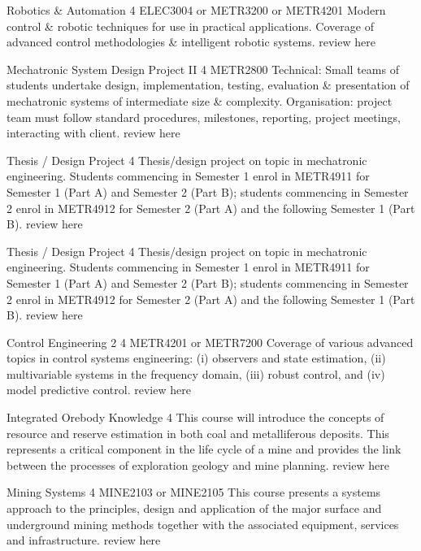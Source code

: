	{Robotics \& Automation}
	{4}
	{ELEC3004 or METR3200 or METR4201}
	{}
	{}
	{Modern control \& robotic techniques for use in practical applications. Coverage of advanced control methodologies \& intelligent robotic systems.}
	{review here}

	{Mechatronic System Design Project II}
	{4}
	{}
	{METR2800}
	{}
	{Technical: Small teams of students undertake design, implementation, testing, evaluation \& presentation of mechatronic systems of intermediate size \& complexity. Organisation: project team must follow standard procedures, milestones, reporting, project meetings, interacting with client.}
	{review here}

	{Thesis / Design Project}
	{4}
	{}
	{}
	{}
	{Thesis/design project on topic in mechatronic engineering. Students commencing in Semester 1 enrol in METR4911 for Semester 1 (Part A) and Semester 2 (Part B); students commencing in Semester 2 enrol in METR4912 for Semester 2 (Part A) and the following Semester 1 (Part B).}
	{review here}

	{Thesis / Design Project}
	{4}
	{}
	{}
	{}
	{Thesis/design project on topic in mechatronic engineering. Students commencing in Semester 1 enrol in METR4911 for Semester 1 (Part A) and Semester 2 (Part B); students commencing in Semester 2 enrol in METR4912 for Semester 2 (Part A) and the following Semester 1 (Part B).}
	{review here}

	{Control Engineering 2}
	{4}
	{METR4201 or METR7200}
	{}
	{}
	{Coverage of various advanced topics in control systems engineering: (i) observers and state estimation, (ii) multivariable systems in the frequency domain, (iii) robust control, and (iv) model predictive control.}
	{review here}

	{Integrated Orebody Knowledge}
	{4}
	{}
	{}
	{}
	{This course will introduce the concepts of resource and reserve estimation in both coal and metalliferous deposits. This represents a critical component in the life cycle of a mine and provides the link between the processes of exploration geology and mine planning.}
	{review here}

	{Mining Systems}
	{4}
	{}
	{MINE2103 or MINE2105}
	{}
	{This course presents a systems approach to the principles, design and application of the major surface and underground mining methods together with the associated equipment, services and infrastructure.}
	{review here}

